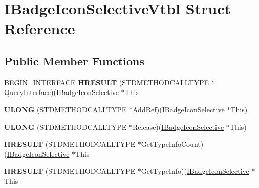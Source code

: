 \hypertarget{struct_i_badge_icon_selective_vtbl}{\section{I\-Badge\-Icon\-Selective\-Vtbl Struct Reference}
\label{struct_i_badge_icon_selective_vtbl}
}
\subsection*{Public Member Functions}
\begin{DoxyCompactItemize}
\item 
\hypertarget{struct_i_badge_icon_selective_vtbl_acd08a801d299bd69aa8d6153ba205902}{B\-E\-G\-I\-N\-\_\-\-I\-N\-T\-E\-R\-F\-A\-C\-E {\bfseries H\-R\-E\-S\-U\-L\-T} (S\-T\-D\-M\-E\-T\-H\-O\-D\-C\-A\-L\-L\-T\-Y\-P\-E $\ast$Query\-Interface)(\hyperlink{interface_i_badge_icon_selective}{I\-Badge\-Icon\-Selective} $\ast$This}\label{struct_i_badge_icon_selective_vtbl_acd08a801d299bd69aa8d6153ba205902}

\item 
\hypertarget{struct_i_badge_icon_selective_vtbl_a9a20605f7d4f0e3df9a913709a1f3426}{{\bfseries U\-L\-O\-N\-G} (S\-T\-D\-M\-E\-T\-H\-O\-D\-C\-A\-L\-L\-T\-Y\-P\-E $\ast$Add\-Ref)(\hyperlink{interface_i_badge_icon_selective}{I\-Badge\-Icon\-Selective} $\ast$This)}\label{struct_i_badge_icon_selective_vtbl_a9a20605f7d4f0e3df9a913709a1f3426}

\item 
\hypertarget{struct_i_badge_icon_selective_vtbl_a5062f18656f5d91a50a2384f11b17e12}{{\bfseries U\-L\-O\-N\-G} (S\-T\-D\-M\-E\-T\-H\-O\-D\-C\-A\-L\-L\-T\-Y\-P\-E $\ast$Release)(\hyperlink{interface_i_badge_icon_selective}{I\-Badge\-Icon\-Selective} $\ast$This)}\label{struct_i_badge_icon_selective_vtbl_a5062f18656f5d91a50a2384f11b17e12}

\item 
\hypertarget{struct_i_badge_icon_selective_vtbl_aa4758742a63e0c40dc4a448a020e7a54}{{\bfseries H\-R\-E\-S\-U\-L\-T} (S\-T\-D\-M\-E\-T\-H\-O\-D\-C\-A\-L\-L\-T\-Y\-P\-E $\ast$Get\-Type\-Info\-Count)(\hyperlink{interface_i_badge_icon_selective}{I\-Badge\-Icon\-Selective} $\ast$This}\label{struct_i_badge_icon_selective_vtbl_aa4758742a63e0c40dc4a448a020e7a54}

\item 
\hypertarget{struct_i_badge_icon_selective_vtbl_a1f4746da10d2734aa403a0fa74c97a87}{{\bfseries H\-R\-E\-S\-U\-L\-T} (S\-T\-D\-M\-E\-T\-H\-O\-D\-C\-A\-L\-L\-T\-Y\-P\-E $\ast$Get\-Type\-Info)(\hyperlink{interface_i_badge_icon_selective}{I\-Badge\-Icon\-Selective} $\ast$This}\label{struct_i_badge_icon_selective_vtbl_a1f4746da10d2734aa403a0fa74c97a87}


\end{DoxyCompactItemize}
